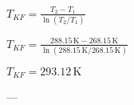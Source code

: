 \( T_{KF} = \frac{T_{2} - T_{1}}{\ln(T_{2}/T_{1})} \)  

\( T_{KF} = \frac{288.15 \, \text{K} - 268.15 \, \text{K}}{\ln(288.15 \, \text{K} / 268.15 \, \text{K})} \)  

\( T_{KF} = 293.12 \, \text{K} \)  

---